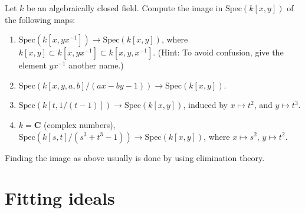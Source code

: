 \begin{exercise}
\label{exercise-images}
Let $k$ be an algebraically closed field. Compute the image in
$\text{Spec}(k[x, y])$
of the following maps:
\begin{enumerate}
\item $\text{Spec}(k[x, yx^{-1}]) \to \text{Spec}(k[x, y])$, where
$k[x, y] \subset k[x, yx^{-1}] \subset k[x, y, x^{-1}]$.
(Hint: To avoid confusion, give the element $yx^{-1}$ another name.)
\item $\text{Spec}(k[x, y, a, b]/(ax-by-1))\to \text{Spec}(k[x, y])$.
\item $\text{Spec}(k[t, 1/(t-1)]) \to \text{Spec}(k[x, y])$, induced by $x
\mapsto t^2$,
and $y \mapsto t^3$.
\item $k = {\mathbf C}$ (complex numbers),
$\text{Spec}(k[s, t]/(s^3 + t^3-1)) \to \text{Spec}(k[x, y])$, where
$x\mapsto s^2$, $y \mapsto t^2$.
\end{enumerate}
\end{exercise}

\begin{remark}
\label{remark-elimination-theory}
Finding the image as above usually is done by using elimination theory.
\end{remark}




\section{Fitting ideals}
\label{section-fitting-ideals}

